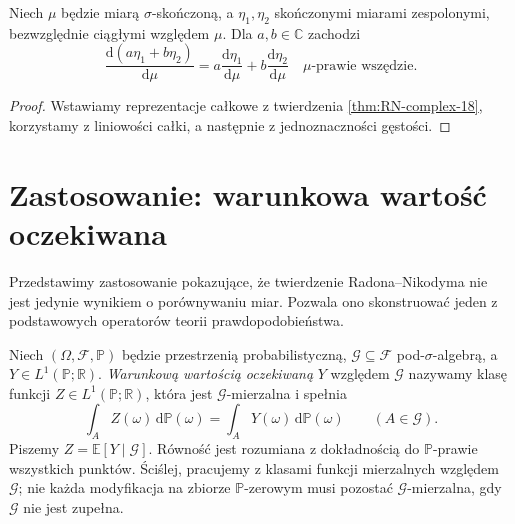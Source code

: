 \begin{wniosek}
\label{cor:RN-linearity-18}
Niech $\mu$ będzie miarą $\sigma$-skończoną,
a $\eta_1,\eta_2$ skończonymi miarami zespolonymi,
bezwzględnie ciągłymi względem $\mu$.
Dla $a,b\in\mathbb C$ zachodzi
\[
\frac{\mathrm d(a\eta_1+b\eta_2)}{\mathrm d\mu}
=a\frac{\mathrm d\eta_1}{\mathrm d\mu}
+b\frac{\mathrm d\eta_2}{\mathrm d\mu}
\quad\mu\text{-prawie wszędzie}.
\]
\end{wniosek}
\begin{proof}
Wstawiamy reprezentacje całkowe z twierdzenia
\ref{thm:RN-complex-18}, korzystamy z liniowości całki,
a następnie z jednoznaczności gęstości.
\end{proof}

\section{Zastosowanie: warunkowa wartość oczekiwana}
Przedstawimy zastosowanie pokazujące, że twierdzenie
Radona--Nikodyma nie jest jedynie wynikiem o porównywaniu
miar. Pozwala ono skonstruować jeden z podstawowych
operatorów teorii prawdopodobieństwa.

\begin{definicja}
\label{def:conditional-exp-18}
Niech $(\Omega,\mathcal F,\mathbb P)$ będzie przestrzenią
probabilistyczną, $\mathcal G\subseteq\mathcal F$
pod-$\sigma$-algebrą, a $Y\in L^1(\mathbb P;\mathbb R)$.
\emph{Warunkową wartością oczekiwaną} $Y$ względem
$\mathcal G$ nazywamy klasę funkcji
$Z\in L^1(\mathbb P;\mathbb R)$, która jest
$\mathcal G$-mierzalna i spełnia
\begin{equation}\label{eq:CE-def-18}
\int_A Z(\omega)\,\mathrm d\mathbb P(\omega)
=\int_A Y(\omega)\,\mathrm d\mathbb P(\omega)
\qquad(A\in\mathcal G).
\end{equation}
Piszemy $Z=\mathbb E[Y\mid\mathcal G]$.
Równość jest rozumiana z dokładnością do
$\mathbb P$-prawie wszystkich punktów. Ściślej, pracujemy
z klasami funkcji mierzalnych względem $\mathcal G$;
nie każda modyfikacja na zbiorze $\mathbb P$-zerowym musi
pozostać $\mathcal G$-mierzalna, gdy $\mathcal G$ nie jest zupełna.
\end{definicja}

